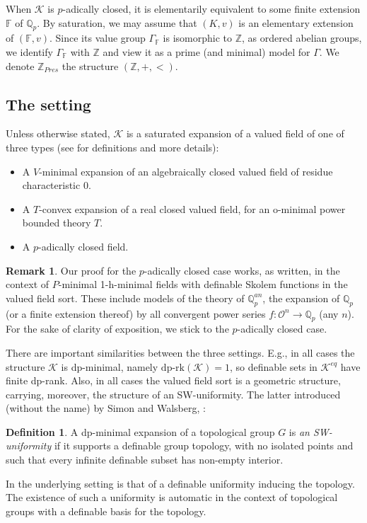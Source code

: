 \documentclass[11pt]{amsart}
\theoremstyle{definition}
\newtheorem{definition}[theorem]{Definition}
\newtheorem{remark}[theorem]{Remark}
\newcommand{\Zz}{{\mathbb {Z}}}
\newcommand{\CK}{{\mathcal K}}
\newcommand{\CO}{{\mathcal O}}
\newcommand{\0}{\emptyset}
\def\qp{\mathbb Q_p}
\def\dpr{\mathrm{dp\text{-}rk}}
\begin{document}
When $\CK$ is $p$-adically closed, it is elementarily equivalent to some finite  extension  $\mathbb{F}$ of $\mathbb{Q}_p$.  By saturation, we may assume that $(K,v)$ is an elementary extension of $(\mathbb{F},v)$.  Since its value group $\Gamma_{\mathbb{F}}$ is isomorphic to $\mathbb{Z}$, as ordered abelian groups,  we identify $\Gamma_{\mathbb{F}}$ with $\mathbb{Z}$ and view it as a prime (and minimal) model for $\Gamma$. We denote $\Zz_{Pres}$ the structure $(\Zz, +, <)$.

\subsection{The setting}
Unless otherwise stated, $\CK$ is a saturated expansion of a valued field of one of  three types
 (see \cite{HaHaPeGps} for definitions and more details):

\begin{itemize}
    \item A $V$-minimal expansion of an algebraically closed valued field of residue characteristic $0$. 
    \item A $T$-convex expansion of a real closed valued field, for an o-minimal power bounded theory $T$.
    \item A $p$-adically closed field.
\end{itemize}

\begin{remark}
    Our proof for the $p$-adically closed case works, as written, in the context of $P$-minimal 1-h-minimal fields with definable Skolem functions in the valued field sort. These include models of the theory of $\qp^{an}$, the expansion of $\qp$ (or a finite extension thereof) by all convergent power series $f: \CO^n\to \qp$ (any $n$). For the sake of clarity of exposition, we stick to the $p$-adically closed case. 
\end{remark}

 There are important similarities between the three settings. E.g.,  in all cases the structure $\CK$ is  dp-minimal, namely $\dpr(\CK)=1$, so definable sets in $\CK^{eq}$ have finite dp-rank. Also, in all cases the valued field sort is a geometric structure, carrying, moreover,  the structure of an SW-uniformity. The latter introduced (without the name) by Simon and Walsberg, \cite{SimWal}: 
 \begin{definition}
    A dp-minimal expansion of a topological group $G$ is {\em 
    an SW-uniformity} if it supports a definable  group topology, with no isolated points and such that every infinite definable subset has non-empty interior.    
 \end{definition}
 In \cite{SimWal} the underlying setting is that of a definable uniformity inducing the topology. The existence of such a uniformity is automatic in the context of topological groups with a definable basis for the topology. 
 
\end{document}
